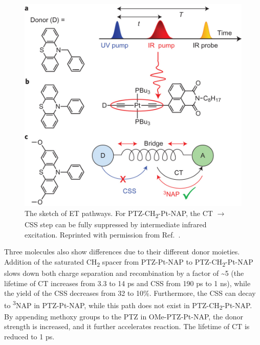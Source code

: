 \begin{figure}[!h]
\includegraphics[width=0.71\columnwidth]{Chapters/chap4/Images/scheme.jpg}
\caption{The sketch of ET pathways. For PTZ-CH\textsubscript{2}-Pt-NAP, the CT $\rightarrow$ CSS step can be fully suppressed by intermediate infrared excitation. Reprinted with permission from Ref.~\cite{delor2015mechanism}.\label{ETscheme}}
\end{figure}

Three molecules also show differences due to their different donor moieties. Addition of the saturated CH\textsubscript{2} spacer from PTZ-Pt-NAP to PTZ-CH\textsubscript{2}-Pt-NAP slows down both charge separation and recombination by a factor of \textasciitilde 5 (the lifetime of CT increases from 3.3 to 14 ps and CSS from 190 ps to 1 ns), while the yield of the CSS decreases from 32 to 10\%. Furthermore, the CSS can decay to \textsuperscript{3}NAP in PTZ-Pt-NAP, while this path does not exist in PTZ-CH\textsubscript{2}-Pt-NAP. By appending methoxy groups to the PTZ in OMe-PTZ-Pt-NAP, the donor strength is increased, and it further accelerates reaction. The lifetime of CT is reduced to 1 ps.


